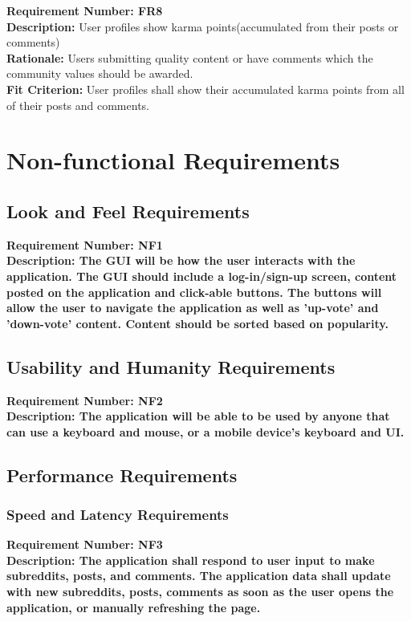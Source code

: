 \documentclass[12pt,fleqn]{article}
\begin{document}
\begin{tcolorbox}
\textbf{Requirement Number: FR8} \\
\textbf{Description:} User profiles show karma points(accumulated from their posts or comments) \\
\textbf{Rationale:} Users submitting quality content or have comments which the community values should be awarded.\\
\textbf{Fit Criterion:} User profiles shall show their accumulated karma points from all of their posts and comments.
\end{tcolorbox}

\pagebreak
\section {Non-functional Requirements}

\subsection {Look and Feel Requirements}
\begin{tcolorbox}
\textbf{Requirement Number: NF1} \\
\textbf{Description:
 The GUI will be how the user interacts with the application.  The GUI should include a log-in/sign-up screen, content posted on the application and click-able buttons.  The buttons will allow the user to navigate the application as well as 'up-vote' and 'down-vote' content.  Content should be sorted based on popularity.  }  
\end{tcolorbox}

\subsection {Usability and Humanity Requirements}
\begin{tcolorbox}
\textbf{Requirement Number: NF2} \\
\textbf{Description:
The application will be able to be used by anyone that can use a keyboard and mouse, or a mobile device's keyboard and UI.}
\end{tcolorbox}

\subsection {Performance Requirements}
\subsubsection {Speed and Latency Requirements}
\begin{tcolorbox}
\textbf{Requirement Number: NF3} \\
\textbf{Description:
The application shall respond to user input to make subreddits, posts, and comments. The application data shall update with new subreddits, posts, comments as soon as the user opens the application, or manually refreshing the page.}
\end{tcolorbox}
\end{document}
